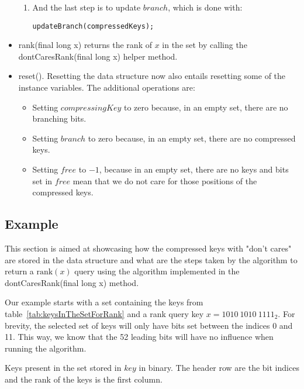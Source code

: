\begin{itemize}
\begin{enumerate}
        \item
        And the last step is to update $branch$, which is done with:
        \begin{lstlisting}
updateBranch(compressedKeys);
        \end{lstlisting}
    \end{enumerate}
    
    \item
    {\ttfamily rank(final long x)} returns the rank of $x$ in the set by calling the {\ttfamily dontCaresRank(final long x)} helper method.
    
    \item
    {\ttfamily reset()}.
    Resetting the data structure now also entails resetting some of the instance variables. The additional operations are:
    \begin{itemize}
        \item
        Setting $compressingKey$ to zero because, in an empty set, there are no branching bits.
        
        \item
        Setting $branch$ to zero because, in an empty set, there are no compressed keys.
        
        \item
        Setting $free$ to $-1$, because in an empty set, there are no keys and bits set in $free$ mean that we do not care for those positions of the compressed keys.
    \end{itemize}
\end{itemize}

\subsection{Example} \label{sec:dontCaresRankExample}

This section is aimed at showcasing how the compressed keys with "don't cares" are stored in the data structure and what are the steps taken by the algorithm to return a $\text{rank}(x)$ query using the algorithm implemented in the {\ttfamily dontCaresRank(final long x)} method.

Our example starts with a set containing the keys from table~\ref{tab:keysInTheSetForRank} and a rank query key $x = 1010\ 1010\ 1111_2$. For brevity, the selected set of keys will only have bits set between the indices 0 and 11. This way, we know that the 52 leading bits will have no influence when running the algorithm.

\begin{table}[H]
\centering

\caption[Example of keys present in the set stored in $key$ in binary]{Keys present in the set stored in $key$ in binary. The header row are the bit indices and the rank of the keys is the first column.}
\label{tab:keysInTheSetForRank}
\end{table}

